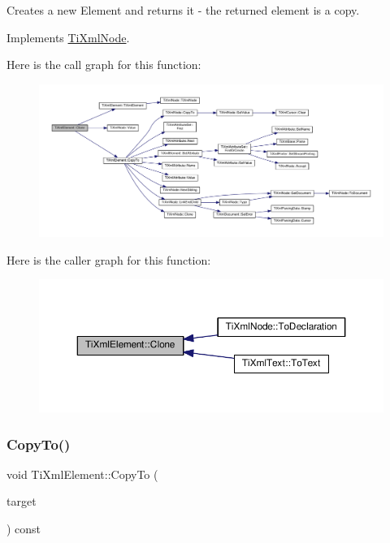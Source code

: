 Creates a new Element and returns it -\/ the returned element is a copy. 



Implements \hyperlink{class_ti_xml_node_a4508cc3a2d7a98e96a54cc09c37a78a4}{Ti\+Xml\+Node}.

Here is the call graph for this function\+:\nopagebreak
\begin{figure}[H]
\begin{center}
\leavevmode
\includegraphics[width=350pt]{class_ti_xml_element_a810ea8fa40844c01334e5af2a26794cb_cgraph}
\end{center}
\end{figure}
Here is the caller graph for this function\+:\nopagebreak
\begin{figure}[H]
\begin{center}
\leavevmode
\includegraphics[width=350pt]{class_ti_xml_element_a810ea8fa40844c01334e5af2a26794cb_icgraph}
\end{center}
\end{figure}
\mbox{\label{class_ti_xml_element_ab931f2208ed76ba03465d8a1f86b5935}} 
\subsubsection{\texorpdfstring{Copy\+To()}{CopyTo()}}
{\footnotesize\ttfamily void Ti\+Xml\+Element\+::\+Copy\+To (\begin{DoxyParamCaption}\item[{\hyperlink{class_ti_xml_element}{Ti\+Xml\+Element} $\ast$}]{target }\end{DoxyParamCaption}) const\hspace{0.3cm}{\ttfamily [protected]}}

